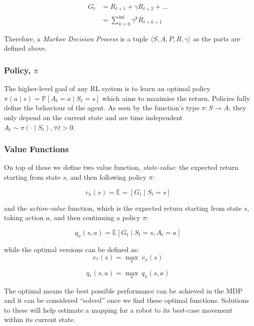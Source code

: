     \[ 
    \begin{aligned}
      G_t &= R_{t+1} + \gamma R_{t+2} + \ldots \\ 
      &= \sum_{k=0}^{\inf}\gamma^k R_{t+k+1} 
    \end{aligned}
    \]
    
    Therefore, a \emph{Markov Decision Process} is a tuple \(\langle S, A, P, R, \gamma \rangle\) as the parts are defined above.
    
    
  \subsubsection{Policy, $\pi$}
    The higher-level goal of any RL system is to learn an optimal policy \(\pi \left( a \mid s\right) = \mathbb{P} \left[A_t = a \mid S_t = s\right]\) which aims to maximise the return. Policies fully define the behaviour of the agent. As seen by the function's type \(\pi: S \rightarrow A \); they only depend on the current state and are time independent \( A_t \sim \pi\left( \cdot \mid S_t\right), \forall t > 0 \).
    
  \subsubsection{Value Functions}
    On top of these we define two value function, \emph{state-value}: the expected return starting from state $s$, and then following policy $\pi$:

    \[ v_\pi \left(s\right) = \mathbb{E} = \left[G_t \mid S_t = s\right]\]

    and the \emph{action-value} function, which is the expected return starting from state $s$, taking action $a$, and then continuing a policy $\pi$:

    \[ q_\pi \left(s, a\right) = \mathbb{E} \left[ G_t \mid S_t = s, A_t = a\right]\]


    while the optimal versions can be defined as:
    \[v_* \left(s\right) = \underset{\pi}{\max} \ v_\pi \left(s\right)\]

    \[q_* \left(s, a\right) = \underset{\pi}{\max} \ q_\pi \left(s, a\right)\]
    
    The optimal means the best possible performance can be achieved in the MDP and it can be considered ``solved'' once we find these optimal functions. Solutions to these will help estimate a mapping for a robot to its best-case movement within its current state.


    

